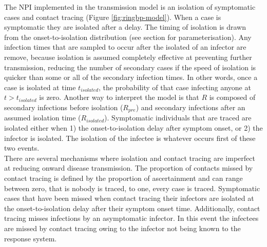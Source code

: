 \documentclass{article}
\begin{document}
The NPI implemented in the transmission model is an isolation of symptomatic cases and contact tracing (Figure \ref{fig:ringbp-model}). When a case is symptomatic they are isolated after a delay. The timing of isolation is drawn from the onset-to-isolation distribution (see  section for parameterisation). Any infection times that are sampled to occur after the isolated of an infector are remove, because isolation is assumed completely effective at preventing further transmission, reducing the number of secondary cases if the speed of isolation is quicker than some or all of the secondary infection times. In other words, once a case is isolated at time $t_{isolated}$, the probability of that case infecting anyone at $t > t_{isolated}$ is zero. Another way to interpret the model is that $R$ is composed of secondary infections before isolation ($R_{pre}$) and secondary infections after an assumed isolation time ($R_{isolated}$). Symptomatic individuals that are traced are isolated either when 1) the onset-to-isolation delay after symptom onset, or 2) the infector is isolated. The isolation of the infectee is whatever occurs first of these two events.  \\

There are several mechanisms where isolation and contact tracing are imperfect at reducing onward disease transmission. The proportion of contacts missed by contact tracing is defined by the proportion of ascertainment and can range between zero, that is nobody is traced, to one, every case is traced. Symptomatic cases that have been missed when contact tracing their infectors are isolated at the onset-to-isolation delay after their symptom onset time. Additionally, contact tracing misses infections by an asymptomatic infector. In this event the infectees are missed by contact tracing owing to the infector not being known to the response system. \\
\end{document}
